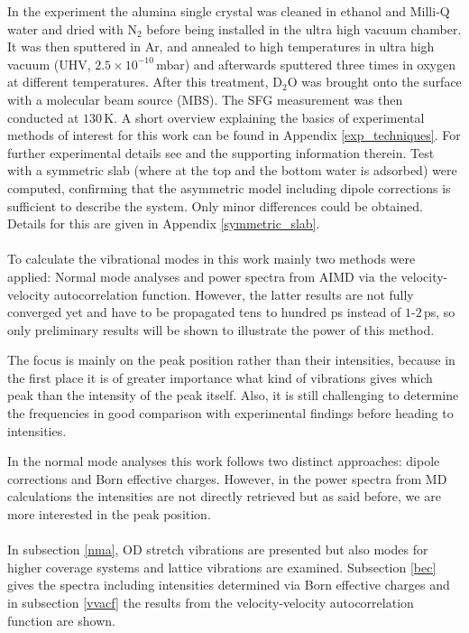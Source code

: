 \documentclass[11pt,DIV=13,BCOR=5mm,a4paper,headinclude]{scrbook}
\begin{document}
In the experiment the alumina single crystal was cleaned in ethanol and Milli-Q water and dried with N$_2$ before being installed in the ultra high vacuum chamber.
It was then sputtered in Ar, and annealed to high temperatures in ultra high vacuum (UHV, $2.5\times 10^{-10}\,$mbar) and afterwards sputtered three times in oxygen at different temperatures.
After this treatment, D$_2$O was brought onto the surface with a molecular beam source (MBS).
The SFG measurement was then conducted at $130\,$K.
A short overview explaining the basics of experimental methods of interest for this work can be found in Appendix \ref{exp_techniques}.
For further experimental details see \cite{Heiden11-20_2018} and the supporting information therein.
Test with a symmetric slab (where at the top and the bottom water is adsorbed) were computed, confirming that the asymmetric model including dipole corrections is sufficient to describe the system.
Only minor differences could be obtained.
Details for this are given in Appendix \ref{symmetric_slab}.
\\
\\

To calculate the vibrational modes in this work mainly two methods were applied: Normal mode analyses and power spectra from AIMD via the velocity-velocity autocorrelation function.
However, the latter results are not fully converged yet and have to be propagated tens to hundred ps instead of $1$-$2\,$ps, so only preliminary results will be shown to illustrate the power of this method.


The focus is mainly on the peak position rather than their intensities, because in the first place it is of greater importance what kind of vibrations gives which peak than the intensity of the peak itself.
Also, it is still challenging to determine the frequencies in good comparison with experimental findings before heading to intensities.


In the normal mode analyses this work follows two distinct approaches: dipole corrections and Born effective charges.
However, in the power spectra from MD calculations the intensities are not directly retrieved but as said before, we are more interested in the peak position.
\\\\

In subsection \ref{nma}, OD stretch vibrations are presented but also modes for higher coverage systems and lattice vibrations are examined.
Subsection \ref{bec} gives the spectra including intensities determined via Born effective charges and in subsection \ref{vvacf} the results from the velocity-velocity autocorrelation function are shown.
\end{document}
